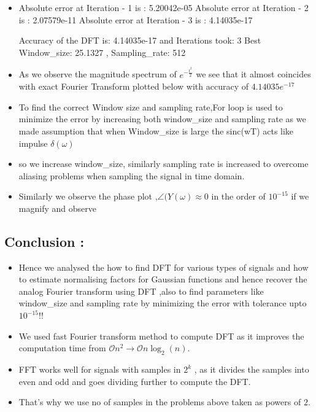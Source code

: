 \documentclass[11pt, a4paper]{article}
\begin{document}
   \begin{itemize}
   \item
Absolute error at Iteration - 1 is : 5.20042e-05\newline
Absolute error at Iteration - 2 is : 2.07579e-11\newline
Absolute error at Iteration - 3 is : 4.14035e-17\newline

Accuracy of the DFT is: 4.14035e-17 and Iterations took: 3 \newline
Best Window\_size: 25.1327 , Sampling\_rate: 512

   \item
     As we observe the magnitude spectrum of \(e^{-\frac{t^{2}}{ 2}}\) we
     see that it almost coincides with exact Fourier Transform plotted
     below with accuracy of \(4.14035e^{-17}\)
   \item
     To find the correct Window size and sampling rate,For loop is used to
     minimize the error by increasing both window\_size and sampling rate
     as we made assumption that when Window\_size is large the sinc(wT)
     acts like impulse \(\delta(\omega)\)
   \item
     so we increase window\_size, similarly sampling rate is increased to
     overcome aliasing problems when sampling the signal in time domain.
   \item
     Similarly we observe the phase plot ,\(\angle(Y(\omega) \approx 0\) in
     the order of \(10^{-15}\) if we magnify and observe
   \end{itemize}
   
     
   
     
       
       \subsection{Conclusion :}\label{conclusion}
   
   \begin{itemize}
   
   \item
     Hence we analysed the how to find DFT for various types of signals and
     how to estimate normalising factors for Gaussian functions and hence
     recover the analog Fourier transform using DFT ,also to find
     parameters like window\_size and sampling rate by minimizing the error
     with tolerance upto \(10^{-15}!!\)
   \item
     We used fast Fourier transform method to compute DFT as it improves
     the computation time from
     \(\mathcal{O} n^2 \to \mathcal{O} n\log_2(n)\).
   \item
     FFT works well for signals with samples in \(2^{k}\) , as it divides
     the samples into even and odd and goes dividing further to compute the
     DFT.
   \item
     That's why we use no of samples in the problems above taken as powers
     of \(2\).
   \end{itemize}
   
     
	
		
	
		
			
		

      
\end{document}
